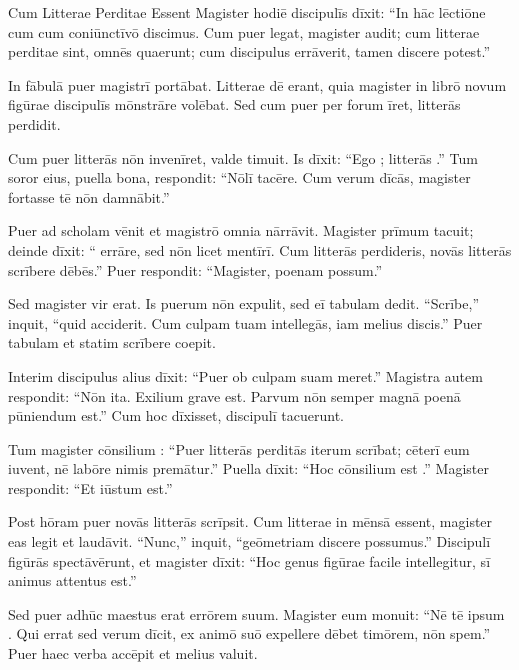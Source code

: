 \documentclass[12pt]{nextbook}
\begin{document}
\begin{readersection}{Cum Litterae Perditae Essent}
Magister hodiē discipulīs dīxit: “In hāc lēctiōne cum cum coniūnctīvō discimus. Cum puer legat, magister audit; cum litterae perditae sint, omnēs quaerunt; cum discipulus errāverit, tamen discere potest.”

In fābulā puer  magistrī portābat. Litterae dē  erant, quia magister in librō novum  figūrae discipulīs mōnstrāre volēbat. Sed cum puer per forum īret, litterās perdidit.

Cum puer litterās nōn invenīret, valde timuit. Is dīxit: “Ego ; litterās .” Tum soror eius, puella bona, respondit: “Nōlī tacēre. Cum verum dīcās, magister fortasse tē nōn damnābit.”

Puer ad scholam vēnit et magistrō omnia nārrāvit. Magister prīmum tacuit; deinde dīxit: “ errāre, sed nōn licet mentīrī. Cum litterās perdideris, novās litterās scrībere dēbēs.” Puer respondit: “Magister, poenam  possum.”

Sed magister vir  erat. Is puerum nōn expulit, sed eī tabulam dedit. “Scrībe,” inquit, “quid acciderit. Cum culpam tuam intellegās, iam melius discis.” Puer tabulam  et statim scrībere coepit.

Interim discipulus alius dīxit: “Puer ob culpam suam  meret.” Magistra autem respondit: “Nōn ita. Exilium grave est. Parvum  nōn semper magnā poenā pūniendum est.” Cum hoc dīxisset, discipulī tacuerunt.

Tum magister cōnsilium : “Puer litterās perditās iterum scrībat; cēterī eum iuvent, nē labōre nimis premātur.” Puella dīxit: “Hoc cōnsilium est .” Magister respondit: “Et iūstum est.”

Post hōram puer novās litterās scrīpsit. Cum litterae in mēnsā essent, magister eas legit et laudāvit. “Nunc,” inquit, “geōmetriam discere possumus.” Discipulī figūrās spectāvērunt, et magister dīxit: “Hoc genus figūrae facile intellegitur, sī animus attentus est.”

Sed puer adhūc maestus erat  errōrem suum. Magister eum monuit: “Nē tē ipsum . Qui errat sed verum dīcit, ex animō suō expellere dēbet timōrem, nōn spem.” Puer haec verba accēpit et melius valuit.


\end{readersection}
\end{document}
